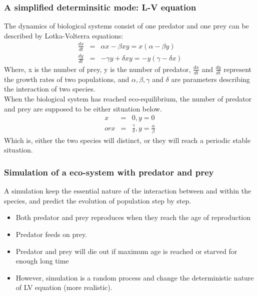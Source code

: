 \documentclass{beamer}
\begin{document}
\frame
{
 \frametitle{A simplified determinsitic mode: L-V equation}
 The dynamics of biological systems consist of one predator and one prey can be described by Lotka-Volterra equations:
 \begin{eqnarray*}
 \frac{dx}{dt} &=& \alpha x - \beta x y = x(\alpha - \beta y) \\
 \frac{dy}{dt} &=& - \gamma y + \delta x y = - y (\gamma - \delta x)
 \end{eqnarray*}
 Where, x is the number of prey, y is the number of predator, $\frac{dx}{dt}$ and $\frac{dy}{dt}$ represent the growth rates of two populations, and $\alpha, \beta, \gamma$ and $\delta$ are parameters describing the interaction of two species. \\
 When the biological system has reached eco-equilibrium, the number of predator and prey are supposed to be either situation below.
 \begin{eqnarray*}
 x &=& 0, y = 0 \\
 or x &=& \frac{\gamma}{\delta}, y = \frac{\alpha}{\beta}
 \end{eqnarray*}
 Which is, either the two species will distinct, or they will reach a periodic stable situation.
}


\frame
{
  \frametitle{Simulation of a eco-system with predator and prey}
  A simulation keep the essential nature of the interaction between and within the species, and predict the evolution of population step by step.
  \begin{itemize}
  \item<1->{Both predator and prey reproduces when they reach the age of reproduction}
  \item<2->{Predator feeds on prey.}
  \item<3->{Predator and prey will die out if maximum age is reached or starved for enough long time}
  \item<4->{However, simulation is a random process and change the deterministic nature of LV equation (more realistic).}
  \end{itemize} 
}
\end{document}
